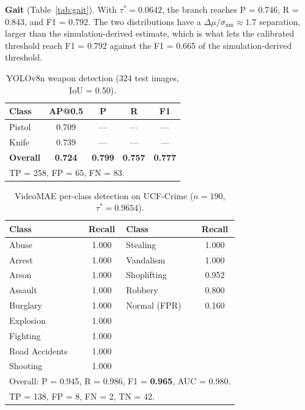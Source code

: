 \documentclass[runningheads]{llncs}
\begin{document}
\begin{algorithm}[!htbp]
\textbf{Gait} (Table~\ref{tab:gait}). With $\tau^* = 0.0642$, the branch reaches P = 0.746, R = 0.843, and F1 = 0.792. The two distributions have a $\Delta\mu / \sigma_\text{nm} \approx 1.7$ separation, larger than the simulation-derived estimate, which is what lets the calibrated threshold reach F1 = 0.792 against the F1 = 0.665 of the simulation-derived threshold.

\begin{table}[!htbp]
\caption{YOLOv8n weapon detection (324 test images, IoU = 0.50).}
\label{tab:yolo}
\centering
\begin{tabular}{lcccc}
\toprule
\textbf{Class} & \textbf{AP@0.5} & \textbf{P} & \textbf{R} & \textbf{F1}\\
\midrule
Pistol & 0.709 & --- & --- & ---\\
Knife  & 0.739 & --- & --- & ---\\
\midrule
\textbf{Overall} & \textbf{0.724} & \textbf{0.799} & \textbf{0.757} & \textbf{0.777}\\
\bottomrule
\multicolumn{5}{l}{\footnotesize TP = 258, FP = 65, FN = 83.}
\end{tabular}
\end{table}

\begin{table}[!htbp]
\caption{VideoMAE per-class detection on UCF-Crime ($n = 190$, $\tau^* = 0.9654$).}
\label{tab:mae}
\centering
\setlength{\tabcolsep}{4pt}
\begin{tabular}{lc@{\hspace{12pt}}lc}
\toprule
\textbf{Class} & \textbf{Recall} & \textbf{Class} & \textbf{Recall}\\
\midrule
Abuse          & 1.000 & Stealing    & 1.000\\
Arrest         & 1.000 & Vandalism   & 1.000\\
Arson          & 1.000 & Shoplifting & 0.952\\
Assault        & 1.000 & Robbery     & 0.800\\
Burglary       & 1.000 & Normal (FPR)& 0.160\\
Explosion      & 1.000 & & \\
Fighting       & 1.000 & & \\
Road Accidents & 1.000 & & \\
Shooting       & 1.000 & & \\
\midrule
\multicolumn{4}{l}{\footnotesize Overall: P = 0.945, R = 0.986, F1 = \textbf{0.965}, AUC = 0.980.}\\
\multicolumn{4}{l}{\footnotesize TP = 138, FP = 8, FN = 2, TN = 42.}\\
\bottomrule
\end{tabular}
\end{table}


\end{algorithm}
\end{document}
